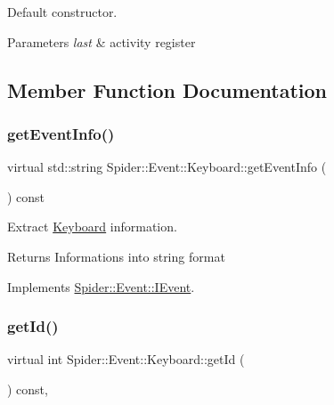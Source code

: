 Default constructor. 


\begin{DoxyParams}{Parameters}
{\em last} & activity register \\
\hline
\end{DoxyParams}


\subsection{Member Function Documentation}
\mbox{\label{class_spider_1_1_event_1_1_keyboard_a3ea8239e9f2002ea2a4eb5dd0bbbb55a}} 
\subsubsection{\texorpdfstring{get\+Event\+Info()}{getEventInfo()}}
{\footnotesize\ttfamily virtual std\+::string Spider\+::\+Event\+::\+Keyboard\+::get\+Event\+Info (\begin{DoxyParamCaption}{ }\end{DoxyParamCaption}) const\hspace{0.3cm}{\ttfamily [virtual]}}



Extract \hyperlink{class_spider_1_1_event_1_1_keyboard}{Keyboard} information. 

\begin{DoxyReturn}{Returns}
Informations into string format 
\end{DoxyReturn}


Implements \hyperlink{class_spider_1_1_event_1_1_i_event_ac8471df73080237faea55de539d968a0}{Spider\+::\+Event\+::\+I\+Event}.

\mbox{\label{class_spider_1_1_event_1_1_keyboard_aea1252251ac9ee1c7b71d0b0fcc7cc0a}} 
\subsubsection{\texorpdfstring{get\+Id()}{getId()}}
{\footnotesize\ttfamily virtual int Spider\+::\+Event\+::\+Keyboard\+::get\+Id (\begin{DoxyParamCaption}{ }\end{DoxyParamCaption}) const\hspace{0.3cm}{\ttfamily [inline]}, {\ttfamily [virtual]}}



